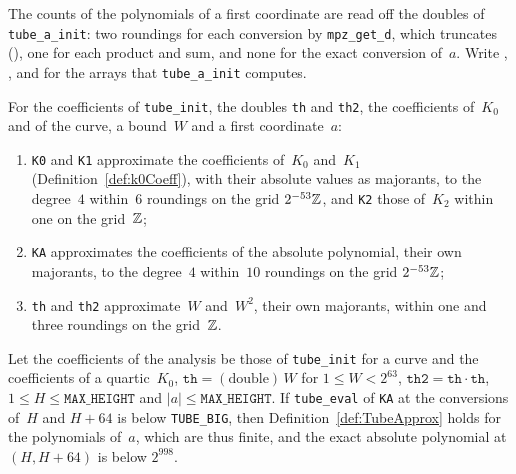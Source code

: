 The counts of the polynomials of a first coordinate are read off the doubles of
\texttt{tube\_a\_init}: two roundings for each conversion by \texttt{mpz\_get\_d}, which truncates
(), one for each product and sum, and none for the exact
conversion of~$a$. Write , , 
and  for the arrays that \texttt{tube\_a\_init} computes.

\begin{definition}\label{def:TubeApprox}
  \leanok
  For the coefficients of \texttt{tube\_init}, the doubles \texttt{th} and \texttt{th2}, the
  coefficients of~$K_0$ and of the curve, a bound~$W$ and a first coordinate~$a$:
  \begin{enumerate}
    \item \texttt{K0} and \texttt{K1} approximate the coefficients of~$K_0$ and~$K_1$
      (Definition~\ref{def:k0Coeff}), with their absolute values as majorants, to the degree~$4$
      within~$6$ roundings on the grid $2^{-53}\mathbb{Z}$, and \texttt{K2} those of~$K_2$ within one on
      the grid~$\mathbb{Z}$;
    \item \texttt{KA} approximates the coefficients of the absolute polynomial, their own
      majorants, to the degree~$4$ within~$10$ roundings on the grid $2^{-53}\mathbb{Z}$;
    \item \texttt{th} and \texttt{th2} approximate~$W$ and~$W^2$, their own majorants, within one
      and three roundings on the grid~$\mathbb{Z}$.
  \end{enumerate}
\end{definition}

\begin{lemma}\label{lem:TubeApprox.of_tubeOk}
  \leanok
  Let the coefficients of the analysis be those of \texttt{tube\_init} for a curve and the
  coefficients of a quartic~$K_0$, $\mathtt{th} = (\mathrm{double})\,W$ for $1 \le W < 2^{63}$,
  $\mathtt{th2} = \mathtt{th} \cdot \mathtt{th}$, $1 \le H \le \mathtt{MAX\_HEIGHT}$ and
  $|a| \le \mathtt{MAX\_HEIGHT}$. If \texttt{tube\_eval} of \texttt{KA} at the conversions of~$H$
  and $H + 64$ is below \texttt{TUBE\_BIG}, then Definition~\ref{def:TubeApprox} holds for the
  polynomials of~$a$, which are thus finite, and the exact absolute polynomial at $(H, H + 64)$ is
  below $2^{998}$.
\end{lemma}

